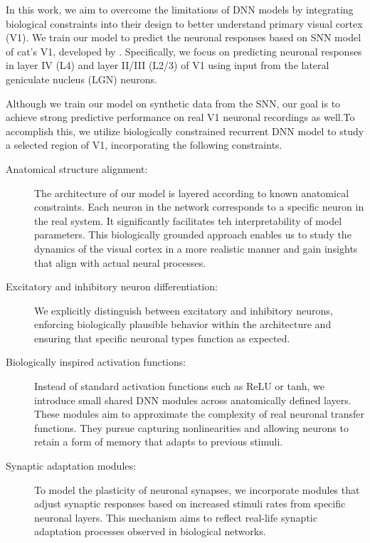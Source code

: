 In this work, we aim to overcome the limitations of DNN models by 
integrating biological constraints into their design to better 
understand primary visual cortex (V1). We train our model
to predict the neuronal responses based on SNN model of cat's V1,
developed by \citet{antolik2024comprehensive}. Specifically, we
focus on predicting neuronal responses in layer IV (L4)
and layer II/III (L2/3) of V1 using input from the 
lateral geniculate nucleus (LGN) neurons. 

Although we train our model on synthetic data from the SNN, 
our goal is to achieve strong predictive performance on real V1 
neuronal recordings as well.To accomplish this, we utilize biologically
constrained recurrent DNN model to study a selected region of V1, 
incorporating the following constraints.

\begin{description}
    \item[Anatomical structure alignment:] The architecture of our
    model is layered according to known anatomical constraints. Each
    neuron in the network corresponds to a specific neuron in the real
    system. It significantly facilitates teh interpretability of model
    parameters. This biologically grounded approach enables us to study
    the dynamics of the visual cortex in a more realistic manner and 
    gain insights that align with actual neural processes.

    \item[Excitatory and inhibitory neuron differentiation:] We explicitly
    distinguish between excitatory and inhibitory neurons, enforcing 
    biologically plausible behavior within the architecture and ensuring 
    that specific neuronal types function as expected.
    
    \item[Biologically inspired activation functions:] Instead of standard
    activation functions such as ReLU or tanh, we introduce small shared
    DNN modules across anatomically defined layers. These modules aim to
    approximate the complexity of real neuronal transfer functions. They
    pursue capturing nonlinearities and allowing neurons to retain a form
    of memory that adapts to previous stimuli.

    \item[Synaptic adaptation modules:] To model the plasticity of neuronal
    synapses, we incorporate modules that adjust synaptic responses based on
    increased stimuli rates from specific neuronal layers. This mechanism aims
    to reflect real-life synaptic adaptation processes observed in biological 
    networks.
\end{description}

